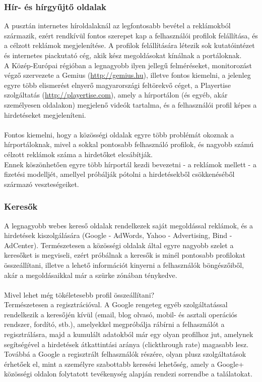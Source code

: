 \subsubsection{Hír- és hírgyűjtő oldalak} %
\label{ssub:hír_és_hírgyűjtő_oldalak}
A pusztán internetes híroldalaknál az legfontosabb bevétel a reklámokból származik, ezért rendkívül fontos szerepet kap a felhasználói profilok felállítása, és a célzott reklámok megjelenítése. A profilok felállítására létezik sok kutatóintézet és internetes piackutató cég, akik kész megoldásokat kínálnak a portáloknak.\hfill\\
A Közép-Európai régióban a legnagyobb ilyen jellegű felméréseket, monitorozást végző szervezete a Gemius (\url{http://gemius.hu}), illetve fontos kiemelni, a jelenleg egyre több elismerést elnyerő magyarországi feltörekvő céget, a Playertise szolgáltatás (\url{http://playertise.com}), amely a hírportálon (és egyéb, akár személyesen oldalakon) megjelenő videók tartalma, és a felhasználói profil képes a hirdetéseket megjeleníteni.\hfill\\
\\
Fontos kiemelni, hogy a közösségi oldalak egyre több problémát okoznak a hírportáloknak, mivel a sokkal pontosabb felhasználó profilok, és nagyobb számú célzott reklámok száma a hirdetőket elcsábítják. \cite{newspaper_ad_revenue}\hfill\\
Ennek köszönhetően egyre több hírportál kezdi bevezetni - a reklámok mellett - a fizetési modelljét, amellyel próbálják pótolni a hirdetésekből csökkenéséből származó veszteségeiket. \cite{newspapers_go_to_paying_model}

\subsubsection{Keresők} %
\label{ssub:keresők}
A legnagyobb webes kereső oldalak rendelkezek saját megoldással reklámok, és a hirdetések kiszolgálására (Google - AdWords, Yahoo - Advertising, Bind - AdCenter). Természetesen a közösségi oldalak által egyre nagyobb szelet a keresőket is megviseli, ezért próbálnak a keresők is minél pontosabb profilokat összeállítani, illetve a lehető információt kinyerni a felhasználók böngészőiből, akár a megoldásaikkal már a szürke zónában ténykedve. \cite{google_on_safari}\hfill\\
\\
Mivel lehet még tökéletesebb profil összeállítani?
\\
Természetesen a regisztrációval. A Google rengeteg egyéb szolgáltatással rendelkezik a keresőjén kívül (email, blog olvasó, mobil- és asztali operációs rendszer, fordító, stb.), amelyekkel megpróbálja rábírni a felhasználót a regisztrálásra, majd a kumulált adatokból már egy olyan profilhoz jut, amelynek segítségével a hirdetések átkattintási aránya (clickthrough rate) magasabb lesz. Továbbá a Google a regisztrált felhasználók részére, olyan plusz szolgáltatások érhetőek el, mint a személyre szabottabb keresési lehetőség, amely a Google+ közösségi oldalon folytatott tevékenység alapján rendezi sorrendbe a találatokat. \cite{gplus_personal}
